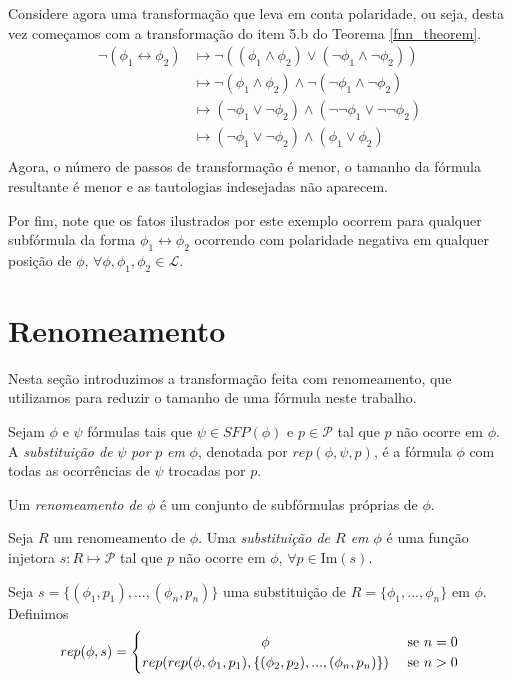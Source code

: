 \begin{example}
    Considere agora uma transformação que leva em conta polaridade, ou seja, desta vez começamos com a transformação do item 5.b do Teorema \ref{fnn_theorem}.
    \begin{equation*}
        \begin{split}
            \neg(\phi_1 \leftrightarrow \phi_2) & \longmapsto \neg((\phi_1 \wedge \phi_2) \vee (\neg \phi_1 \wedge \neg \phi_2)) \\
                 & \longmapsto \neg(\phi_1 \wedge \phi_2) \wedge \neg(\neg \phi_1 \wedge \neg \phi_2) \\
                 & \longmapsto (\neg \phi_1 \vee \neg \phi_2) \wedge (\neg \neg \phi_1 \vee \neg \neg \phi_2) \\
                 & \longmapsto (\neg \phi_1 \vee \neg \phi_2) \wedge (\phi_1 \vee \phi_2) \\
        \end{split}
    \end{equation*}
    Agora, o número de passos de transformação é menor, o tamanho da fórmula resultante é menor e as tautologias indesejadas não aparecem.
    
    Por fim, note que os fatos ilustrados por este exemplo ocorrem para qualquer subfórmula da forma $\phi_1 \leftrightarrow \phi_2$ ocorrendo com polaridade negativa em qualquer posição de $\phi$, $\forall \phi,\phi_1,\phi_2 \in \mathcal{L}$.
\end{example}

\section{Renomeamento}

\indent

Nesta seção introduzimos a transformação feita com renomeamento, que utilizamos para reduzir o tamanho de uma fórmula neste trabalho.

\begin{definition}
	Sejam $\phi$ e $\psi$ fórmulas tais que $\psi \in SFP(\phi)$ e $p \in \mathcal{P}$ tal que $p$ não ocorre em $\phi$. A \emph{substituição de} $\psi$ \emph{por} $p$ \emph{em} $\phi$, denotada por $rep(\phi,\psi,p)$, é a fórmula $\phi$ com todas as ocorrências de $\psi$ trocadas por $p$.
	
	Um \emph{renomeamento de $\phi$} é um conjunto de subfórmulas próprias de $\phi$.
	
	Seja $R$ um renomeamento de $\phi$. Uma \emph{substituição de $R$ em $\phi$} é uma função injetora $s : R \longmapsto \mathcal{P}$ tal que $p$ não ocorre em $\phi$, $\forall p \in \text{Im}(s)$.
	
	Seja $s = \{(\phi_1,p_1),...,(\phi_n,p_n) \}$ uma substituição de $R = \{\phi_1,...,\phi_n \}$ em $\phi$. Definimos
	\[
	rep(\phi,s) =
	\begin{cases} 
	\hfill \phi    \hfill & \text{ se $n=0$} \\
	\hfill rep(rep(\phi,\phi_1,p_1),\{(\phi_2,p_2),...,(\phi_n,p_n)\}) \hfill & \text{ se $n > 0$} \\
	\end{cases}
	\]
\end{definition}

